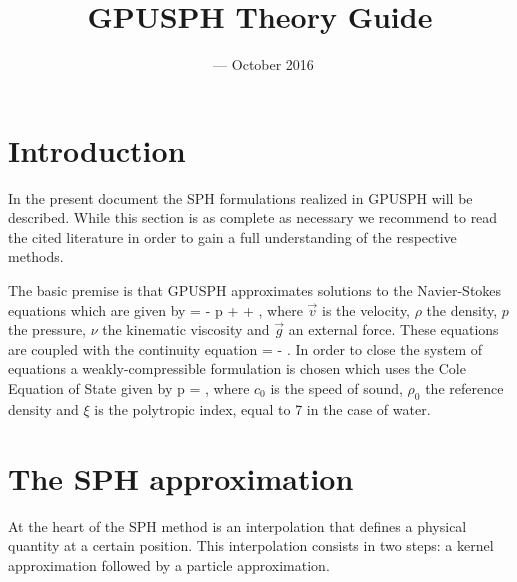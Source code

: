 \documentclass{../GPUSPHtemplate}
\title{GPUSPH Theory Guide}
\author{}
\date{\currentver\ --- October 2016}
\begin{document}
\maketitle
\tableofcontents
\clearpage
\section{Introduction}

In the present document the SPH formulations realized in GPUSPH will be
described. While this section is as complete as necessary we recommend
to read the cited literature in order to gain a full understanding of
the respective methods.

The basic premise is that GPUSPH approximates solutions to the
Navier-Stokes equations which are given by
\be
{} = -\vec{\nabla} p + \nabla \cdot {} + ,
\label{e:sph:ns}
\en
where $\vec{v}$ is the velocity, $\rho$ the density, $p$ the
pressure, $\nu$ the kinematic viscosity and $\vec{g}$ an external
force. These equations are coupled with the continuity equation
\be
{} = - \rho \nabla \cdot {}.
\label{e:sph:cont}
\en
In order to close the system of equations a weakly-compressible
formulation is chosen which uses the Cole Equation of State given by
\be
p = ,
\label{e:sph:eos}
\en
where $c_0$ is the speed of sound, $\rho_0$ the reference density and
$\xi$ is the polytropic index, equal to 7 in the case of water.

\section{The SPH approximation}

At the heart of the SPH method is an interpolation that defines a
physical quantity at a certain position. This interpolation consists
in two steps: a kernel approximation followed by a particle approximation.
\end{document}
